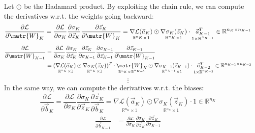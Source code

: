 \begin{description}
        Let $\odot$ be the Hadamard product.
        By exploiting the chain rule, we can compute the derivatives w.r.t. the weights going backward:
        \[
            \frac{\partial\mathcal{L}}{\partial\matr{W}_K} = 
                \frac{\partial\mathcal{L}}{\partial\sigma_K} \frac{\partial\sigma_K}{\partial\vec{z}_K} \frac{\partial\vec{z}_K}{\partial\matr{W}_K} =
                    \underset{\mathbb{R}^{n_K} \times 1}{\nabla\mathcal{L}(\vec{a}_K)} \odot 
                    \underset{\mathbb{R}^{n_K} \times 1}{\nabla\sigma_K(\vec{z}_K)} \cdot 
                    \underset{1 \times \mathbb{R}^{n_{K-1}}}{\vec{a}_{K-1}^T}
            \in \mathbb{R}^{n_K \times n_{K-1}}
        \]
        \[
            \begin{split}
                \frac{\partial\mathcal{L}}{\partial\matr{W}_{K-1}} &= 
                    \frac{\partial\mathcal{L}}{\partial\sigma_K} \frac{\partial\sigma_K}{\partial\vec{z}_{K}} \frac{\partial\vec{z}_{K}}{\partial\sigma_{K-1}} 
                    \frac{\partial\sigma_{K-1}}{\partial\vec{z}_{K-1}} \frac{\partial\vec{z}_{K-1}}{\partial\matr{W}_{K-1}} \\
                    &= (
                            \underset{\mathbb{R}^{n_K} \times 1}{\nabla\mathcal{L}(\vec{a}_K)} \odot 
                            \underset{\mathbb{R}^{n_K} \times 1}{\nabla\sigma_K(\vec{z}_K)} 
                        )^T \cdot 
                        \underset{\mathbb{R}^{n_K} \times \mathbb{R}^{n_{K-1}}}{\matr{W}_K} \odot 
                        \underset{\mathbb{R}^{n_{K-1}} \times 1}{\nabla\sigma_{K-1}(\vec{z}_{K-1})} \cdot 
                        \underset{1 \times \mathbb{R}^{n_{K-2}}}{\vec{a}_{K-2}^T}
                \in \mathbb{R}^{n_{K-1} \times n_{K-2}}
            \end{split}
        \]
        \[ \vdots \]
        In the same way, we can compute the derivatives w.r.t. the biases:
        \[
            \frac{\partial\mathcal{L}}{\partial\vec{b}_K} = 
                \frac{\partial\mathcal{L}}{\partial\sigma_K} \frac{\partial\sigma_K}{\partial\vec{z}_K} \frac{\partial\vec{z}_K}{\partial\vec{b}_K} =
                \underset{\mathbb{R}^{n_K} \times 1}{\nabla\mathcal{L}(\vec{a}_K)} \odot 
                \underset{\mathbb{R}^{n_K} \times 1}{\nabla\sigma_K(\vec{z}_K)} \cdot 
                1
            \in \mathbb{R}^{n_K}
        \]
        \[
            \begin{split}
                \frac{\partial\mathcal{L}}{\partial\vec{b}_{K-1}} &= 
                    \frac{\partial\mathcal{L}}{\partial\sigma_K} \frac{\partial\sigma_K}{\partial\vec{z}_{K}} \frac{\partial\vec{z}_{K}}{\partial\sigma_{K-1}} 

\end{split}\]
\end{description}
